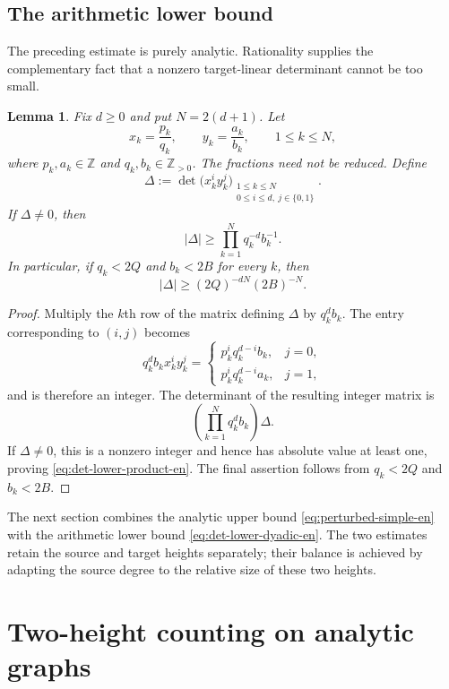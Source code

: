 \documentclass[11pt]{amsart}
\numberwithin{equation}{section}
\newtheorem{lemma}[lemma]{Lemma}
\theoremstyle{definition}
\theoremstyle{remark}
\newcommand{\Z}{\mathbb Z}
\newcommand{\abs}[1]{\left\lvert #1\right\rvert}
\begin{document}
\subsection{The arithmetic lower bound}

The preceding estimate is purely analytic. Rationality supplies the
complementary fact that a nonzero target-linear determinant cannot be
too small.

\begin{lemma}\label{lem:det-lower-en}
Fix $d\geq0$ and put $N=2(d+1)$. Let
\[
x_k=\frac{p_k}{q_k},
\qquad
y_k=\frac{a_k}{b_k},
\qquad1\leq k\leq N,
\]
where $p_k,a_k\in\Z$ and $q_k,b_k\in\Z_{>0}$. The fractions need not be
reduced. Define
\[
\Delta
:=
\det\bigl(x_k^iy_k^j\bigr)_{
\substack{1\leq k\leq N\\0\leq i\leq d,\ j\in\{0,1\}}}.
\]
If $\Delta\neq0$, then
\begin{equation}\label{eq:det-lower-product-en}
\abs{\Delta}\geq\prod_{k=1}^Nq_k^{-d}b_k^{-1}.
\end{equation}
In particular, if $q_k<2Q$ and $b_k<2B$ for every $k$, then
\begin{equation}\label{eq:det-lower-dyadic-en}
\abs{\Delta}\geq(2Q)^{-dN}(2B)^{-N}.
\end{equation}
\end{lemma}

\begin{proof}
Multiply the $k$th row of the matrix defining $\Delta$ by $q_k^db_k$.
The entry corresponding to $(i,j)$ becomes
\[
q_k^db_kx_k^iy_k^j
=
\begin{cases}
 p_k^iq_k^{d-i}b_k,&j=0,\\
 p_k^iq_k^{d-i}a_k,&j=1,
\end{cases}
\]
and is therefore an integer. The determinant of the resulting integer
matrix is
\[
\left(\prod_{k=1}^Nq_k^db_k\right)\Delta.
\]
If $\Delta\neq0$, this is a nonzero integer and hence has absolute
value at least one, proving \eqref{eq:det-lower-product-en}. The final assertion follows from $q_k<2Q$ and $b_k<2B$.
\end{proof}

The next section combines the analytic upper bound
\eqref{eq:perturbed-simple-en} with the arithmetic lower bound
\eqref{eq:det-lower-dyadic-en}. The two estimates retain the source
and target heights separately; their balance is achieved by adapting
the source degree to the relative size of these two heights.

\section{Two-height counting on analytic graphs}
\label{sec:scarcity}
\end{document}
